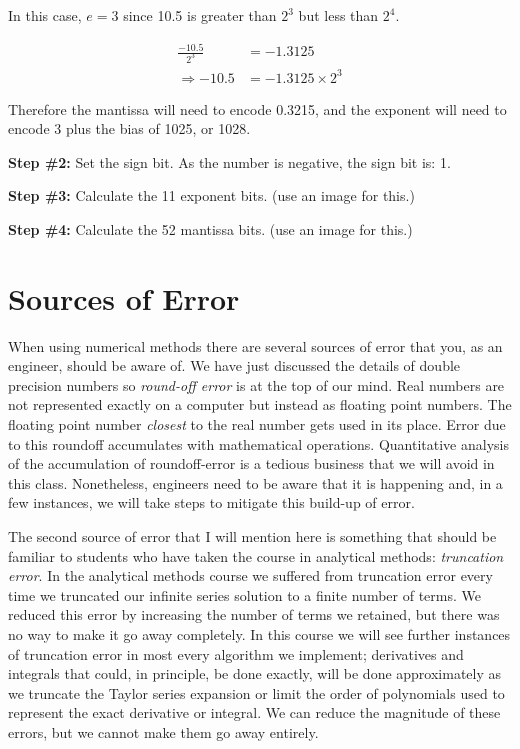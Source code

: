 \noindent In this case, $e=3$ since 10.5 is greater than $2^3$ but less than $2^4$.  

\begin{align*}
\frac{-10.5}{2^3} & = -1.3125 \\
\Rightarrow -10.5 &= -1.3125 \times 2^3
\end{align*}

\noindent Therefore the mantissa will need to encode 0.3215, and the exponent will need to encode 3 plus the bias of 1025, or 1028.

\vspace{0.25cm}

\noindent\textbf{Step \#2:} Set the sign bit. As the number is negative, the sign bit is: 1.

\vspace{0.25cm}

\noindent\textbf{Step \#3:} Calculate the 11 exponent bits.  (use an image for this.)   
  

\vspace{0.25cm}

\noindent\textbf{Step \#4:} Calculate the 52 mantissa bits. (use an image for this.)

\section{Sources of Error}   

When using numerical methods there are several sources of error that you, as an engineer, should be aware of.  We have just discussed the details of double precision numbers so \emph{round-off error} is at the top of our mind.  Real numbers are not represented exactly on a computer but instead as floating point numbers.  The floating point number \emph{closest} to the real number gets used in its place. Error due to this roundoff accumulates with mathematical operations.  Quantitative analysis of the accumulation of roundoff-error is a tedious business that we will avoid in this class.  Nonetheless, engineers need to be aware that it is happening and, in a few instances, we will take steps to mitigate this build-up of error.

The second source of error that I will mention here is something that should be familiar to students who have taken the course in analytical methods: \emph{truncation error}.  In the analytical methods course we suffered from truncation error every time we truncated our infinite series solution to a finite number of terms.  We reduced this error by increasing the number of terms we retained, but there was no way to make it go away completely.  In this course we will see further instances of truncation error in most every algorithm we implement; derivatives and integrals that could, in principle, be done exactly, will be done approximately as we truncate the Taylor series expansion or limit the order of polynomials used to represent the exact derivative or integral.  We can reduce the magnitude of these errors, but we cannot make them go away entirely.

